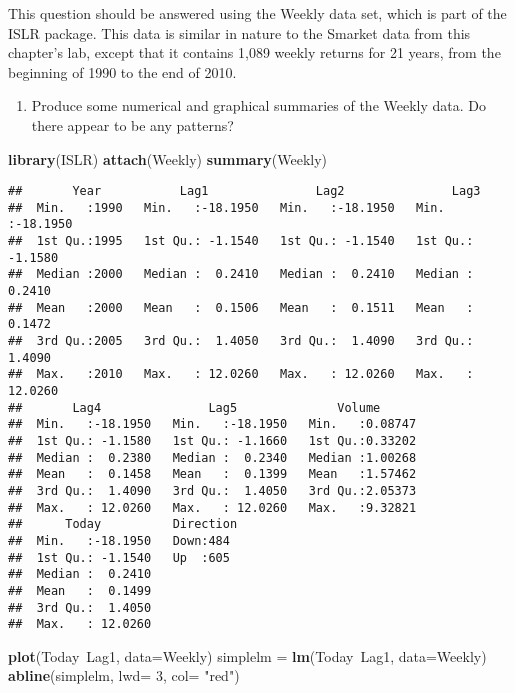 \documentclass[]{article}
\newenvironment{Shaded}{\begin{snugshade}}{\end{snugshade}}
\newcommand{\KeywordTok}[1]{\textcolor[rgb]{0.13,0.29,0.53}{\textbf{{#1}}}}
\newcommand{\DataTypeTok}[1]{\textcolor[rgb]{0.13,0.29,0.53}{{#1}}}
\newcommand{\DecValTok}[1]{\textcolor[rgb]{0.00,0.00,0.81}{{#1}}}
\newcommand{\StringTok}[1]{\textcolor[rgb]{0.31,0.60,0.02}{{#1}}}
\newcommand{\NormalTok}[1]{{#1}}
\providecommand{\tightlist}{%
  \setlength{\itemsep}{0pt}\setlength{\parskip}{0pt}}
\begin{document}
This question should be answered using the Weekly data set, which is
part of the ISLR package. This data is similar in nature to the Smarket
data from this chapter's lab, except that it contains 1,089 weekly
returns for 21 years, from the beginning of 1990 to the end of 2010.

\begin{enumerate}
\def\labelenumi{(\alph{enumi})}
\tightlist
\item
  Produce some numerical and graphical summaries of the Weekly data. Do
  there appear to be any patterns?
\end{enumerate}

\begin{Shaded}
\begin{Highlighting}[]
\KeywordTok{library}\NormalTok{(ISLR)}
\KeywordTok{attach}\NormalTok{(Weekly)}
\KeywordTok{summary}\NormalTok{(Weekly)}
\end{Highlighting}
\end{Shaded}

\begin{verbatim}
##       Year           Lag1               Lag2               Lag3         
##  Min.   :1990   Min.   :-18.1950   Min.   :-18.1950   Min.   :-18.1950  
##  1st Qu.:1995   1st Qu.: -1.1540   1st Qu.: -1.1540   1st Qu.: -1.1580  
##  Median :2000   Median :  0.2410   Median :  0.2410   Median :  0.2410  
##  Mean   :2000   Mean   :  0.1506   Mean   :  0.1511   Mean   :  0.1472  
##  3rd Qu.:2005   3rd Qu.:  1.4050   3rd Qu.:  1.4090   3rd Qu.:  1.4090  
##  Max.   :2010   Max.   : 12.0260   Max.   : 12.0260   Max.   : 12.0260  
##       Lag4               Lag5              Volume       
##  Min.   :-18.1950   Min.   :-18.1950   Min.   :0.08747  
##  1st Qu.: -1.1580   1st Qu.: -1.1660   1st Qu.:0.33202  
##  Median :  0.2380   Median :  0.2340   Median :1.00268  
##  Mean   :  0.1458   Mean   :  0.1399   Mean   :1.57462  
##  3rd Qu.:  1.4090   3rd Qu.:  1.4050   3rd Qu.:2.05373  
##  Max.   : 12.0260   Max.   : 12.0260   Max.   :9.32821  
##      Today          Direction 
##  Min.   :-18.1950   Down:484  
##  1st Qu.: -1.1540   Up  :605  
##  Median :  0.2410             
##  Mean   :  0.1499             
##  3rd Qu.:  1.4050             
##  Max.   : 12.0260
\end{verbatim}

\begin{Shaded}
\begin{Highlighting}[]
\KeywordTok{plot}\NormalTok{(Today~Lag1, }\DataTypeTok{data=}\NormalTok{Weekly)}
\NormalTok{simplelm =}\StringTok{ }\KeywordTok{lm}\NormalTok{(Today~Lag1, }\DataTypeTok{data=}\NormalTok{Weekly)}
\KeywordTok{abline}\NormalTok{(simplelm, }\DataTypeTok{lwd=} \DecValTok{3}\NormalTok{, }\DataTypeTok{col=} \StringTok{"red"}\NormalTok{)}
\end{Highlighting}
\end{Shaded}
\end{document}

